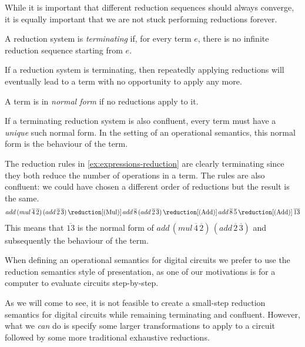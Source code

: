 While it is important that different reduction sequences should always converge,
it is equally important that we are not stuck performing reductions forever.

\begin{definition}
    A reduction system is \emph{terminating} if, for every term \(e\), there is
    no infinite reduction sequence starting from \(e\).
\end{definition}

If a reduction system is terminating, then repeatedly applying reductions will
eventually lead to a term with no opportunity to apply any more.

\begin{definition}
    A term is in \emph{normal form} if no reductions apply to it.
\end{definition}

If a terminating reduction system is also confluent, every term must have a
\emph{unique} such normal form.
In the setting of an operational semantics, this normal form is the behaviour
of the term.

\begin{example}
    The reduction rules in \cref{ex:expressions-reduction} are clearly
    terminating since they both reduce the number of operations in a term.
    The rules are also confluent: we could have chosen a different order of
    reductions but the result is the same.
    \begin{gather*}
        add \, (mul \, \overline{4} \, \overline{2}) \, (add \, \overline{2} \, \overline{3})
        \,\reduction[(\text{Mul})]\,
        add \, \overline{8} \, (add \, \overline{2} \, \overline{3})
        \,\reduction[(\text{Add})]\,
        add \, \overline{8} \, \overline{5}
        \,\reduction[(\text{Add})]\,
        \overline{13}
    \end{gather*}
    This means that \(\overline{13}\) is the normal form of
    \(add \, (mul \, \overline{4} \, \overline{2}) \, (add \, \overline{2} \, \overline{3})\)
    and subsequently the behaviour of the term.
\end{example}

When defining an operational semantics for digital circuits we prefer to use
the reduction semantics style of presentation, as one of our motivations is for
a computer to evaluate circuits step-by-step.

As we will come to see, it is not feasible to create a small-step reduction
semantics for digital circuits while remaining terminating and confluent.
However, what we \emph{can} do is specify some larger transformations to apply
to a circuit followed by some more traditional exhaustive reductions.

